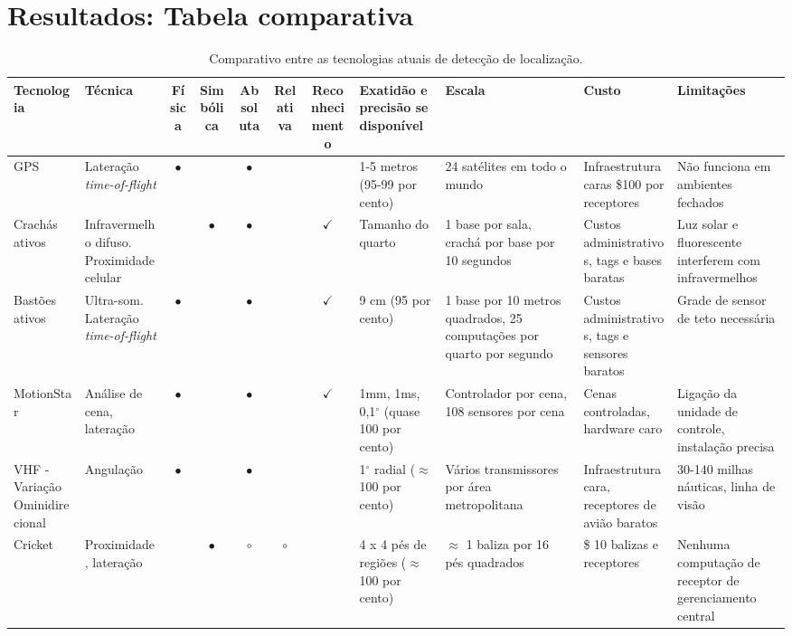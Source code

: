 \section{Resultados: Tabela comparativa}\label{sec:apendiceB}
 \begin{table*}[!ht]
 \caption{Comparativo entre as tecnologias atuais de detecção de localização.}
 \label{table:comparativotecnologias}
 \begin{tabular}{|p{1cm}p{1.3cm}cccccp{1.6cm}p{1.5cm}p{1.5cm}p{1.5cm}|}
\hline  
\textbf{Tecnologia} & \textbf{Técnica} & \textbf{Física} & \textbf{Simbólica} & \textbf{Absoluta} & \textbf{Relativa} & \textbf{Reconhecimento} & \textbf{Exatidão e precisão se disponível} & \textbf{Escala} & \textbf{Custo} & \textbf{Limitações}\\ \hline  
GPS & Lateração \textit{time-of-flight} & $\bullet$& & $\bullet$& & & 1-5 metros (95-99 por cento) & 24 satélites em todo o mundo &Infraestrutura caras \$100 por receptores & Não funciona em ambientes fechados \\\hline
Crachás ativos &Infravermelho difuso. Proximidade celular & & $\bullet$& $\bullet$& & $\checkmark$ & Tamanho do quarto & 1 base por sala, crachá por base por 10 segundos & Custos administrativos, tags e bases baratas & Luz solar e fluorescente interferem com infravermelhos\\\hline
Bastões ativos & Ultra-som. Lateração \textit{time-of-flight} &$\bullet$ & & $\bullet$ & & $\checkmark$ & 9 cm (95 por cento) & 1 base por 10 metros quadrados, 25 computações por quarto por segundo & Custos administrativos, tags e sensores baratos & Grade de sensor de teto necessária\\\hline
MotionStar & Análise de cena, lateração & $\bullet$& & $\bullet$ & & $\checkmark$ & 1mm, 1ms, 0,1$^\circ$ (quase 100 por cento) & Controlador por cena, 108 sensores por cena & 
Cenas controladas, hardware caro & Ligação da unidade de controle, instalação precisa\\\hline
VHF - Variação Ominidirecional & Angulação & $\bullet$ & & $\bullet$ & & & 1$^\circ$ radial ($\approx$ 100 por cento) & Vários transmissores por área metropolitana & Infraestrutura cara, receptores de avião baratos & 30-140 milhas náuticas, linha de visão\\\hline
Cricket &Proximidade, lateração & & $\bullet$ & $\circ$ & $\circ$ & & 4 x 4 pés de regiões ($\approx$ 100 por cento) & $\approx$ 1 baliza por 16 pés quadrados& \$ 10 balizas e receptores & Nenhuma computação de receptor de gerenciamento central\\\hline

\end{tabular}
\end{table*}
